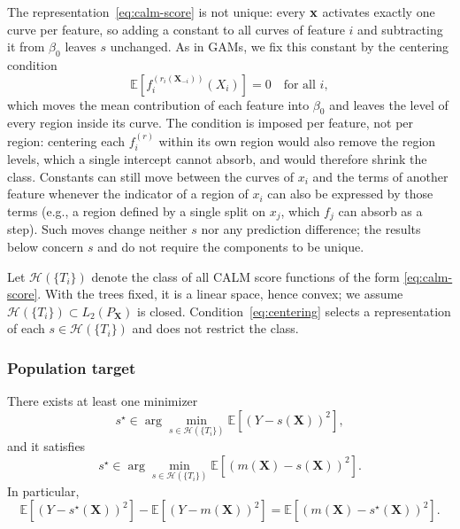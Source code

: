 The representation~\eqref{eq:calm-score} is not unique: every $\mathbf{x}$ activates exactly one curve per feature, so adding a constant to all curves of feature $i$ and subtracting it from $\beta_0$ leaves $s$ unchanged.
As in GAMs, we fix this constant by the centering condition
\begin{equation}
\mathbb{E}\!\left[
f_i^{(r_i(\mathbf{X}_{-i}))}(X_i)
\right]=0
\quad
\text{for all } i,
\label{eq:centering}
\end{equation}
which moves the mean contribution of each feature into $\beta_0$ and leaves the level of every region inside its curve.
The condition is imposed per feature, not per region: centering each $f_i^{(r)}$ within its own region would also remove the region levels, which a single intercept cannot absorb, and would therefore shrink the class.
Constants can still move between the curves of $x_i$ and the terms of another feature whenever the indicator of a region of $x_i$ can also be expressed by those terms (e.g., a region defined by a single split on $x_j$, which $f_j$ can absorb as a step).
Such moves change neither $s$ nor any prediction difference; the results below concern $s$ and do not require the components to be unique.

Let $\mathcal H(\{T_i\})$ denote the class of all CALM score functions of the form
\eqref{eq:calm-score}.
With the trees fixed, it is a linear space, hence convex; we assume $\mathcal H(\{T_i\})\subset L_2(P_{\mathbf{X}})$ is closed.
Condition~\eqref{eq:centering} selects a representation of each $s\in\mathcal H(\{T_i\})$ and does not restrict the class.

\subsubsection{Population target}

\begin{proposition}
\label{prop:population}
There exists at least one minimizer
\[
s^\star
\in
\arg\min_{s\in\mathcal H(\{T_i\})}
\mathbb{E}[(Y-s(\mathbf{X}))^2],
\]
and it satisfies
\[
s^\star
\in
\arg\min_{s\in\mathcal H(\{T_i\})}
\mathbb{E}[(m(\mathbf{X})-s(\mathbf{X}))^2].
\]
In particular,
\[
\mathbb{E}[(Y-s^\star(\mathbf{X}))^2]
-
\mathbb{E}[(Y-m(\mathbf{X}))^2]
=
\mathbb{E}[(m(\mathbf{X})-s^\star(\mathbf{X}))^2].
\]
\end{proposition}

